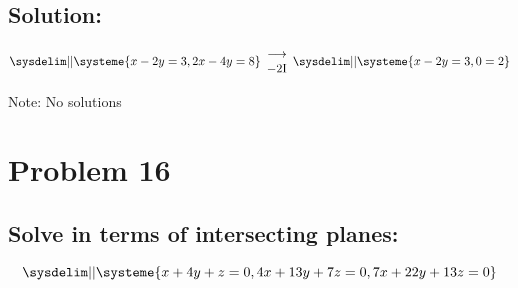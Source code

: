 \documentclass{article}
\begin{document}
\subsection*{Solution:}
\begin{equation*}
    \sysdelim||\systeme{
        x - 2y = 3,
        2x - 4y = 8
    }
    \begin{array}{rr}
        \longrightarrow
        \\
        -2$I$
    \end{array}
    \sysdelim||\systeme{
        x - 2y = 3,
        0 = 2
    }
\end{equation*}
\begin{center}Note: No solutions\end{center}
\begin{center}
\end{center}

\noindent\makebox[\linewidth]{\rule{16cm}{0.4pt}}
\section*{Problem 16}
\subsection*{Solve in terms of intersecting planes: }
$$
\sysdelim||\systeme{
    x + 4y + z = 0,
    4x + 13y + 7z = 0,
    7x + 22y + 13z = 0
}
$$
\end{document}
